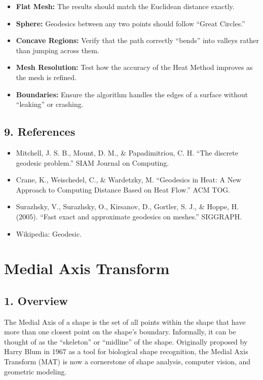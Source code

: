 \begin{itemize}
    \item \textbf{Flat Mesh:} The results should match the Euclidean distance exactly.
    \item \textbf{Sphere:} Geodesics between any two points should follow ``Great Circles.''
    \item \textbf{Concave Regions:} Verify that the path correctly ``bends'' into valleys rather than jumping across them.
    \item \textbf{Mesh Resolution:} Test how the accuracy of the Heat Method improves as the mesh is refined.
    \item \textbf{Boundaries:} Ensure the algorithm handles the edges of a surface without ``leaking'' or crashing.
\end{itemize}

\subsection{9. References}

\begin{itemize}
    \item Mitchell, J. S. B., Mount, D. M., \& Papadimitriou, C. H. \cite{mitchell1987} ``The discrete geodesic problem.'' SIAM Journal on Computing.
    \item Crane, K., Weischedel, C., \& Wardetzky, M. \cite{crane2013geodesic} ``Geodesics in Heat: A New Approach to Computing Distance Based on Heat Flow.'' ACM TOG.
    \item Surazhsky, V., Surazhsky, O., Kirsanov, D., Gortler, S. J., \& Hoppe, H. (2005). ``Fast exact and approximate geodesics on meshes.'' SIGGRAPH.
    \item Wikipedia: Geodesic.
\end{itemize}

\section{Medial Axis Transform}
\label{sec:medial_axis}

\subsection{1. Overview}

The Medial Axis of a shape is the set of all points within the shape that have more than one closest point on the shape's boundary. Informally, it can be thought of as the ``skeleton'' or ``midline'' of the shape. Originally proposed by Harry Blum in 1967\cite{blum1967} as a tool for biological shape recognition, the Medial Axis Transform (MAT) is now a cornerstone of shape analysis, computer vision, and geometric modeling.

